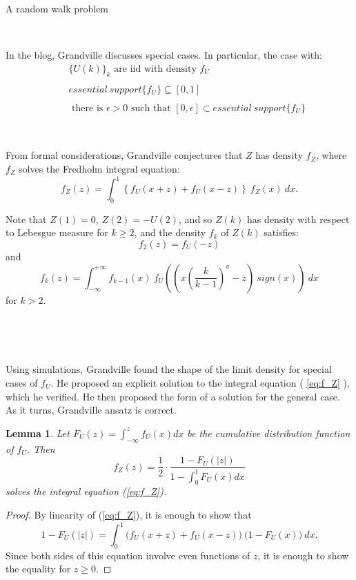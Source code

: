 \documentclass[12pt]{article}
\newtheorem*{lmm}{Lemma}
\begin{document}
\begin{section}{A random walk problem}
\  

\  


In the blog, Grandville discusses special cases. In particular, the case with:
\begin{eqnarray} \label{fu_assm1}
&& \{U(k)\}_k \text{ are iid with density }f_U  \\ 
&& \nonumber \\
&& essential \ support \{ f_U \} \subseteq [0,1] \\
&& \nonumber \\
&& \label{ref:f_U} \text{ there is $\epsilon > 0$ such that }
[0, \epsilon] \subset essential \ support \{ f_U \} 
\end{eqnarray}  

\

From formal considerations, Grandville conjectures that $Z$ has density $f_Z$, where $f_Z$ solves the Fredholm integral equation:
\begin{equation} \label{eq:f_Z}
f_Z(z) = \int_{0}^1 \left\{ f_U(x+z) + f_U(x-z) \right\} \ f_Z(x) \ dx .
\end{equation} 

Note that $Z(1)=0$, $Z(2) = -U(2)$, and so $Z(k)$ has density with respect to Lebesgue measure for $k \ge 2$, and the density $f_k$ of $Z(k)$ satisfies:  
$$
f_2(z) = f_U(-z)
$$
and
$$
f_k(z) = \int_{-\infty}^{+\infty} f_{k-1}(x)\ f_U\!\left(  \left(x \left(\frac{k}{k-1}\right)^a - z \right)\ sign(x) \right) \ dx  
$$
for $k > 2$.  

\

\

Using simulations, Grandville found the shape of the limit density for special cases of $f_U$. He proposed an explicit solution to the integral equation ( \ref{eq:f_Z} ), which he verified. He then proposed the form of a solution for the general case. As it turns, Grandville ansatz is correct.

\begin{lmm}{} Let $F_U(z) = \int_{-\infty}^{z} f_U(x) dx$ be the cumulative distribution function of $f_U$. Then
\begin{equation} \label{VGansatz}
f_Z(z) = \frac{1}{2} \cdot \frac{1-F_U(|z|)}{1-\int_{0}^{1} F_U(x) dx}
\end{equation}
solves the integral equation (\ref{eq:f_Z}). 

\end{lmm}

  \begin{proof} By linearity of (\ref{eq:f_Z}), it is enough to show that 
  	$$1-F_U(|z|) = \int_{0}^1 \big( f_U(x+z) + f_U(x-z) \big) \ \big(1 - F_U(x) \big) \ dx.$$ Since both sides of this equation involve even functions of $z$, it is enough to show the equality for $z \ge 0$.  
  	

\end{proof}
\end{section}
\end{document}
